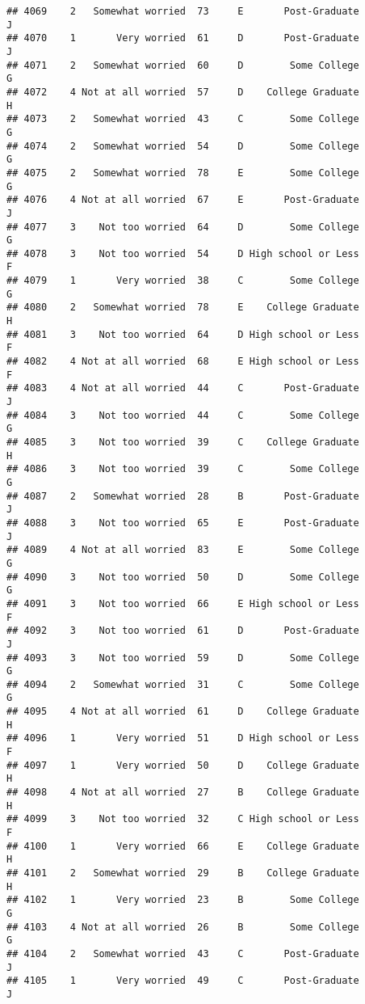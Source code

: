 \documentclass[
]{article}
\begin{document}
\begin{verbatim}
## 4069    2   Somewhat worried  73     E       Post-Graduate         J
## 4070    1       Very worried  61     D       Post-Graduate         J
## 4071    2   Somewhat worried  60     D        Some College         G
## 4072    4 Not at all worried  57     D    College Graduate         H
## 4073    2   Somewhat worried  43     C        Some College         G
## 4074    2   Somewhat worried  54     D        Some College         G
## 4075    2   Somewhat worried  78     E        Some College         G
## 4076    4 Not at all worried  67     E       Post-Graduate         J
## 4077    3    Not too worried  64     D        Some College         G
## 4078    3    Not too worried  54     D High school or Less         F
## 4079    1       Very worried  38     C        Some College         G
## 4080    2   Somewhat worried  78     E    College Graduate         H
## 4081    3    Not too worried  64     D High school or Less         F
## 4082    4 Not at all worried  68     E High school or Less         F
## 4083    4 Not at all worried  44     C       Post-Graduate         J
## 4084    3    Not too worried  44     C        Some College         G
## 4085    3    Not too worried  39     C    College Graduate         H
## 4086    3    Not too worried  39     C        Some College         G
## 4087    2   Somewhat worried  28     B       Post-Graduate         J
## 4088    3    Not too worried  65     E       Post-Graduate         J
## 4089    4 Not at all worried  83     E        Some College         G
## 4090    3    Not too worried  50     D        Some College         G
## 4091    3    Not too worried  66     E High school or Less         F
## 4092    3    Not too worried  61     D       Post-Graduate         J
## 4093    3    Not too worried  59     D        Some College         G
## 4094    2   Somewhat worried  31     C        Some College         G
## 4095    4 Not at all worried  61     D    College Graduate         H
## 4096    1       Very worried  51     D High school or Less         F
## 4097    1       Very worried  50     D    College Graduate         H
## 4098    4 Not at all worried  27     B    College Graduate         H
## 4099    3    Not too worried  32     C High school or Less         F
## 4100    1       Very worried  66     E    College Graduate         H
## 4101    2   Somewhat worried  29     B    College Graduate         H
## 4102    1       Very worried  23     B        Some College         G
## 4103    4 Not at all worried  26     B        Some College         G
## 4104    2   Somewhat worried  43     C       Post-Graduate         J
## 4105    1       Very worried  49     C       Post-Graduate         J

\end{verbatim}
\end{document}
